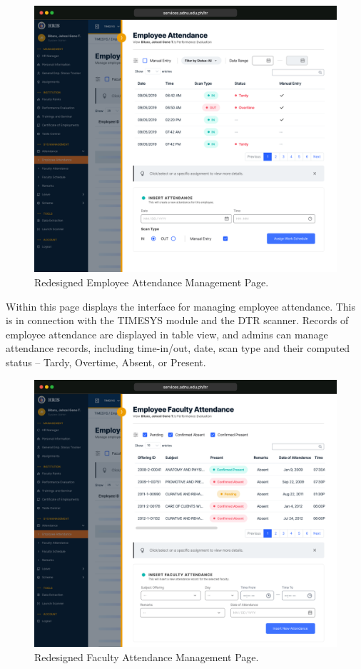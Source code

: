     \begin{figure}[H]
        \centering
        \includegraphics[width=1\linewidth]{figures/app/attendance-emp.png}
        \caption{Redesigned Employee Attendance Management Page.}
        \label{fig:app-attendance-emp}
    \end{figure}

    Within this page displays the interface for managing employee attendance. This is in connection with the TIMESYS module and the DTR scanner. Records of employee attendance are displayed in table view, and admins can manage attendance records, including time-in/out, date, scan type and their computed status -- Tardy, Overtime, Absent, or Present.

    \begin{figure}[H]
        \centering
        \includegraphics[width=1\linewidth]{figures/app/attendance-fac.png}
        \caption{Redesigned Faculty Attendance Management Page.}
        \label{fig:app-attendance-fac}
    \end{figure}

